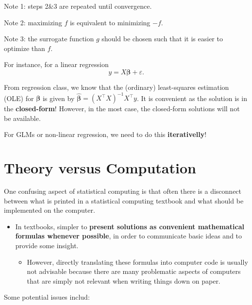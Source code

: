 \documentclass[
  letterpaper,
  DIV=11,
  numbers=noendperiod]{scrreprt}
\providecommand{\tightlist}{%
  \setlength{\itemsep}{0pt}\setlength{\parskip}{0pt}}
\begin{document}
Note 1: steps 2\&3 are repeated until convergence.

Note 2: maximizing \(f\) is equivalent to minimizing \(-f\).

Note 3: the surrogate function \(g\) should be chosen such that it is
easier to optimize than \(f\).

For instance, for a linear regression \begin{equation}
  y = X\boldsymbol{\beta} + \varepsilon. \label{eq:linmod}
\end{equation}

From regression class, we know that the (ordinary) least-squares
estimation (OLE) for \(\boldsymbol{\beta}\) is given by
\(\hat{\boldsymbol{\beta}}=(X^\top X)^{-1} X^\top y\). It is convenient
as the solution is in the \textbf{closed-form}! However, in the most
case, the closed-form solutions will not be available.

For GLMs or non-linear regression, we need to do this
\textbf{iterativelly}!

\section{Theory versus Computation}\label{theory-versus-computation}

One confusing aspect of statistical computing is that often there is a
disconnect between what is printed in a statistical computing textbook
and what should be implemented on the computer.

\begin{itemize}
\tightlist
\item
  In textbooks, simpler to \textbf{present solutions as convenient
  mathematical formulas whenever possible}, in order to communicate
  basic ideas and to provide some insight.

  \begin{itemize}
  \tightlist
  \item
    However, directly translating these formulas into computer code is
    usually not advisable because there are many problematic aspects of
    computers that are simply not relevant when writing things down on
    paper.
  \end{itemize}
\end{itemize}

Some potential issues includ:
\end{document}
